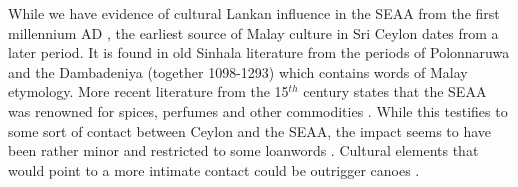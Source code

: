 % 
% 
% 
% 


While we have evidence of cultural Lankan influence in the SEAA from the
first millennium AD \citep{Dupont1959,DeCasparis1961}, the earliest source of Malay culture in Sri
Ceylon dates from a later period. It is found in old Sinhala
literature from the periods of Polonnaruwa and the Dambadeniya
(together 1098-1293) which contains words of Malay etymology. More
recent literature from the 15$^{th}$ century states that the SEAA was
renowned for spices, perfumes and other commodities
\citep[11]{Jayasuriya2002}. While this testifies  to some sort of
contact between Ceylon and the SEAA, the impact seems to have been
rather minor and restricted to some loanwords \citep{Gunasekara1891,Sannasgala1976}. Cultural
elements that would point to a more intimate contact could be
outrigger canoes \citep{Tennent1859}.

